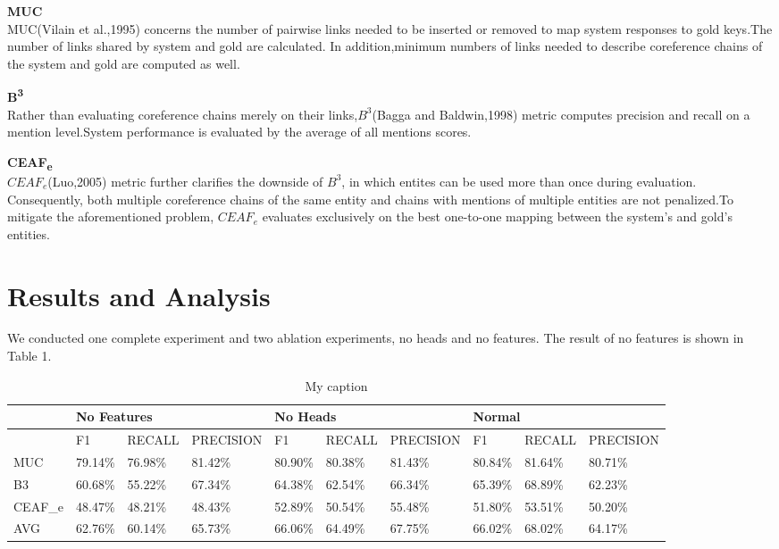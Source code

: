 \documentclass[11pt]{article}
\begin{document}
\textbf{MUC}\\
MUC(Vilain et al.,1995) concerns the number of pairwise links needed to be inserted or removed to map system responses to gold keys.The number of links shared by  system and gold are calculated. In addition,minimum numbers of links needed to describe coreference chains of the system and gold are computed as well.

\textbf{B\textsuperscript{3}} \\
Rather than evaluating coreference chains merely on their links,$B^{3}$(Bagga and Baldwin,1998) metric computes precision and recall on a mention level.System performance is evaluated by the average of all mentions scores.

\textbf{CEAF\textsubscript{e}} \\
$CEAF_e$(Luo,2005) metric further clarifies the downside of $B^{3}$, in which entites can be used more than once during evaluation. Consequently, both multiple coreference chains of the same entity and chains with mentions of multiple entities are not penalized.To mitigate the aforementioned problem, $CEAF_e$ evaluates exclusively on the best one-to-one mapping between the system’s and gold’s entities.


\section{Results and Analysis}
We conducted one complete experiment and two ablation experiments, no heads and no features. The result of no features is shown in Table 1.

\begin{table}[]
\centering
\caption{My caption}
\label{my-label}
\begin{tabular}{|l|l|l|l|l|l|l|l|l|l|}
\hline
        & \multicolumn{3}{l|}{No Features} & \multicolumn{3}{l|}{No Heads} & \multicolumn{3}{l|}{Normal}   \\ \hline
        & F1       & RECALL   & PRECISION  & F1      & RECALL  & PRECISION & F1      & RECALL  & PRECISION \\ \hline
MUC     & 79.14\%  & 76.98\%  & 81.42\%    & 80.90\% & 80.38\% & 81.43\%   & 80.84\% & 81.64\% & 80.71\%   \\ \hline
B3      & 60.68\%  & 55.22\%  & 67.34\%    & 64.38\% & 62.54\% & 66.34\%   & 65.39\% & 68.89\% & 62.23\%   \\ \hline
CEAF\_e & 48.47\%  & 48.21\%  & 48.43\%    & 52.89\% & 50.54\% & 55.48\%   & 51.80\% & 53.51\% & 50.20\%   \\ \hline
AVG     & 62.76\%  & 60.14\%  & 65.73\%    & 66.06\% & 64.49\% & 67.75\%   & 66.02\% & 68.02\% & 64.17\%   \\ \hline
\end{tabular}
\end{table}
\end{document}
